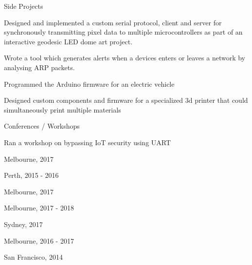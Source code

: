 \begin{cventries}
    \cventry
        {Side Projects}
        {}
        {}
        {}
        {
          \begin{cvitems}
            \item { \acvSubItemSep Designed and implemented a custom serial protocol, client and server for synchronously transmitting pixel data to multiple microcontrollers as part of an interactive geodesic LED dome art project.}
            \item { \acvSubItemSep Wrote a tool which generates alerts when a devices enters or leaves a network by analysing ARP packets.}
            \item { \acvSubItemSep Programmed the Arduino firmware for an electric vehicle}
            \item { \acvSubItemSep Designed custom components and firmware for a specialized 3d printer that could simultaneously print multiple materials}
          \end{cvitems}
        }



    \cventry
        {Conferences / Workshops}
        {}
        {}
        {}
        {
          \begin{cvitems}
            \item { \acvSubItemSep Ran a workshop on bypassing IoT security using UART}
            \item { \acvSubItemSep Melbourne, 2017}
            \item { \acvSubItemSep Perth, 2015 - 2016}
            \item { \acvSubItemSep Melbourne, 2017}
            \item { \acvSubItemSep Melbourne, 2017 - 2018}
            \item { \acvSubItemSep Sydney, 2017}
            \item { \acvSubItemSep Melbourne, 2016 - 2017}
            \item { \acvSubItemSep San Francisco, 2014}
          \end{cvitems}
        }


\end{cventries}
